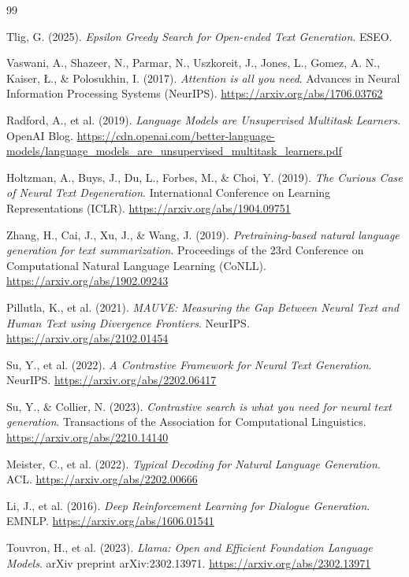 \documentclass[12pt,a4paper]{article}
\begin{document}
\begin{thebibliography}{99} 

Tlig, G. (2025).
\textit{Epsilon Greedy Search for Open-ended Text Generation}.
ESEO.

Vaswani, A., Shazeer, N., Parmar, N., Uszkoreit, J., Jones, L., Gomez, A. N., Kaiser, \L., \& Polosukhin, I. (2017).
\textit{Attention is all you need}.
Advances in Neural Information Processing Systems (NeurIPS).
\url{https://arxiv.org/abs/1706.03762}

Radford, A., et al. (2019).
\textit{Language Models are Unsupervised Multitask Learners}.
OpenAI Blog.
\url{https://cdn.openai.com/better-language-models/language_models_are_unsupervised_multitask_learners.pdf}

Holtzman, A., Buys, J., Du, L., Forbes, M., \& Choi, Y. (2019).
\textit{The Curious Case of Neural Text Degeneration}.
International Conference on Learning Representations (ICLR).
\url{https://arxiv.org/abs/1904.09751}

Zhang, H., Cai, J., Xu, J., \& Wang, J. (2019).
\textit{Pretraining-based natural language generation for text summarization}.
Proceedings of the 23rd Conference on Computational Natural Language Learning (CoNLL).
\url{https://arxiv.org/abs/1902.09243}

Pillutla, K., et al. (2021).
\textit{MAUVE: Measuring the Gap Between Neural Text and Human Text using Divergence Frontiers}.
NeurIPS.
\url{https://arxiv.org/abs/2102.01454}

Su, Y., et al. (2022).
\textit{A Contrastive Framework for Neural Text Generation}.
NeurIPS.
\url{https://arxiv.org/abs/2202.06417}

Su, Y., \& Collier, N. (2023).
\textit{Contrastive search is what you need for neural text generation}.
Transactions of the Association for Computational Linguistics.
\url{https://arxiv.org/abs/2210.14140}

Meister, C., et al. (2022).
\textit{Typical Decoding for Natural Language Generation}.
ACL.
\url{https://arxiv.org/abs/2202.00666}

Li, J., et al. (2016).
\textit{Deep Reinforcement Learning for Dialogue Generation}.
EMNLP.
\url{https://arxiv.org/abs/1606.01541}

Touvron, H., et al. (2023).
\textit{Llama: Open and Efficient Foundation Language Models}.
arXiv preprint arXiv:2302.13971.
\url{https://arxiv.org/abs/2302.13971}

\end{thebibliography}
\end{document}
